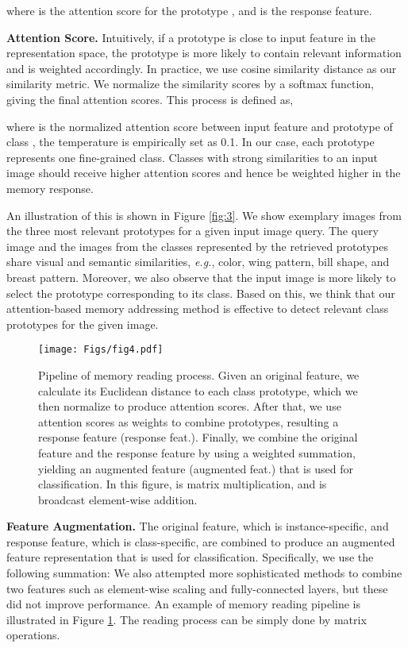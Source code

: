 \documentclass[journal]{IEEEtran}
\begin{document}
where  is the attention score for the prototype , and  is the response feature.

\textbf{Attention Score.} Intuitively, if a prototype is close to input feature in the representation space, the prototype is more likely to contain relevant information and is weighted accordingly.
In practice, we use cosine similarity distance as our similarity metric. We normalize the similarity scores by a softmax function, giving the final attention scores. This process is defined as, 


where  is the normalized attention score between input feature  and prototype  of class , the temperature  is empirically set as 0.1. In our case, each prototype represents one fine-grained class. Classes with strong similarities to an input image should receive higher attention scores and hence be weighted higher in the memory response.

An illustration of this is shown in Figure \ref{fig:3}. 
We show exemplary images from the three most relevant prototypes for a given input image query. 
The query image and the images from the classes represented by the retrieved prototypes share visual and semantic similarities, \emph{e.g.}, color, wing pattern, bill shape, and breast pattern. Moreover, we also observe that the input image is more likely to select the prototype corresponding to its class.
Based on this, we think that our attention-based memory addressing method is effective to detect relevant class prototypes for the given image.


\begin{figure}[t]
\begin{center}
\texttt{[image: Figs/fig4.pdf]}
\end{center}
\caption{Pipeline of memory reading process. Given an original feature, we calculate its Euclidean distance to each class prototype, which we then normalize to produce attention scores. After that, we use attention scores as weights to combine prototypes, resulting a response feature (response feat.). Finally, we combine the original feature and the response feature by using a weighted summation, yielding an augmented feature (augmented feat.) that is used for classification. In this figure,  is matrix multiplication, and  is broadcast element-wise addition.}
\label{fig:4}
\end{figure}


 \textbf{Feature Augmentation.} The original feature, which is instance-specific, and response feature, which is class-specific, are combined to produce an augmented feature representation that is used for classification.
 Specifically, we use the following summation:
 We also attempted more sophisticated methods to combine two features such as element-wise scaling and fully-connected layers, but these did not improve performance. An example of memory reading pipeline is illustrated in Figure \ref{fig:4}. The reading process can be simply done by matrix operations.
\end{document}
